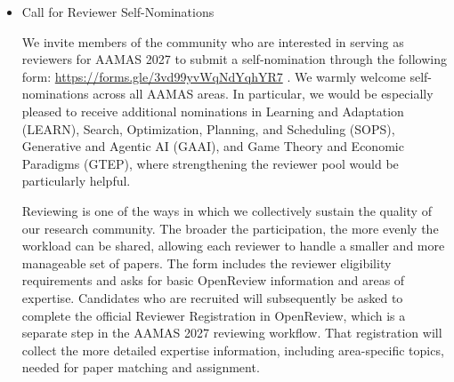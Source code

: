 \documentclass[prodmode,acmtecs]{acmsmall} %
\begin{document}
\begin{itemize}
\begin{itemize}\item  Conference website: \href{https://warwick.ac.uk/fac/sci/dcs/aamas2027/}{https://warwick.ac.uk/fac/sci/dcs/aamas2027/}
\item  Full Call for Papers: \href{https://warwick.ac.uk/fac/sci/dcs/aamas2027/calls/}{https://warwick.ac.uk/fac/sci/dcs/aamas2027/calls/}
\item  Submission instructions: \href{https://warwick.ac.uk/fac/sci/dcs/aamas2027/calls/instructions/}{https://warwick.ac.uk/fac/sci/dcs/aamas2027/calls/instructions/}
\item  Findings of AAMAS: \href{https://warwick.ac.uk/fac/sci/dcs/aamas2027/calls/findings/}{https://warwick.ac.uk/fac/sci/dcs/aamas2027/calls/findings/}
\end{itemize} 
  Please note that all authors must have an OpenReview account, and abstract registration is required before the full-paper submission deadline. Please refer to the conference website for the complete submission, formatting, reviewing, and publication policies. We look forward to receiving your submissions and to welcoming you to AAMAS 2027 in Hanoi. Please feel free to forward this Call for Papers to colleagues, research groups, and relevant mailing lists. 
 
\item  Call for Reviewer Self-Nominations 
 
  We invite members of the community who are interested in serving as reviewers for AAMAS 2027 to submit a self-nomination through the following form: \href{https://forms.gle/3vd99yvWqNdYqhYR7}{https://forms.gle/3vd99yvWqNdYqhYR7} . We warmly welcome self-nominations across all AAMAS areas. In particular, we would be especially pleased to receive additional nominations in Learning and Adaptation (LEARN), Search, Optimization, Planning, and Scheduling (SOPS), Generative and Agentic AI (GAAI), and Game Theory and Economic Paradigms (GTEP), where strengthening the reviewer pool would be particularly helpful. 
 
  Reviewing is one of the ways in which we collectively sustain the quality of our research community. The broader the participation, the more evenly the workload can be shared, allowing each reviewer to handle a smaller and more manageable set of papers. The form includes the reviewer eligibility requirements and asks for basic OpenReview information and areas of expertise. Candidates who are recruited will subsequently be asked to complete the official Reviewer Registration in OpenReview, which is a separate step in the AAMAS 2027 reviewing workflow. That registration will collect the more detailed expertise information, including area-specific topics, needed for paper matching and assignment. 
 

\end{itemize}
\end{document}
